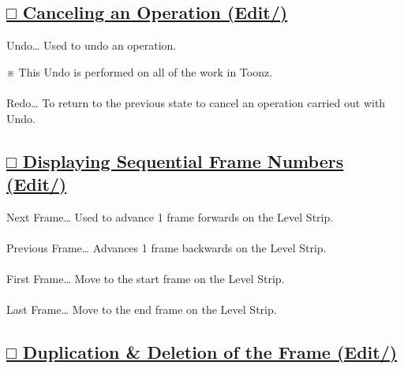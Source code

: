\documentclass[a4paper,10pt]{article}
\begin{document}
\subsection*{\uline{□ Canceling an Operation (Edit/)}}

\normalsize
\noindent Undo… Used to undo an operation.\par
\footnotesize
\noindent ※ This Undo is performed on all of the work in Toonz.\\[-0.3em]
\\
\normalsize
Redo… To return to the previous state to cancel an operation carried out with Undo.

\newpage

\subsection*{\uline{□ Displaying Sequential Frame Numbers (Edit/)}}

\noindent Next Frame… Used to advance 1 frame forwards on the Level Strip.\\[-0.1em]
\\
Previous Frame… Advances 1 frame backwards on the Level Strip.\\[-0.1em]
\\
First Frame… Move to the start frame on the Level Strip.\\[-0.1em]
\\
Last Frame… Move to the end frame on the Level Strip.\\[-0.1em]

\subsection*{\uline{□ Duplication \& Deletion of the Frame (Edit/)}}
\end{document}
